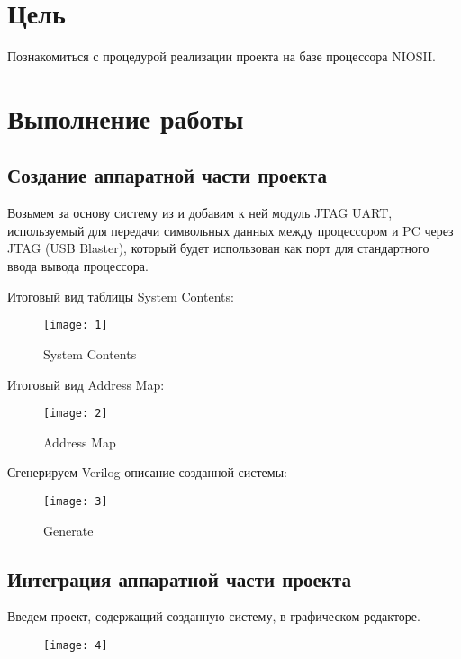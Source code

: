 





\tableofcontents
\lstlistoflistings
\listoffigures
\newpage

\section{Цель}

\noindent Познакомиться с процедурой реализации проекта на базе процессора NIOSII.

\section{Выполнение работы}

\subsection{Создание аппаратной части проекта}

Возьмем за основу систему из  и добавим к ней модуль JTAG UART, используемый для передачи символьных данных между процессором и PC через JTAG (USB Blaster), который будет использован как порт для стандартного ввода вывода процессора.

Итоговый вид таблицы System Contents:
\begin{figure}[H]
	\centering
	\texttt{[image: 1]}
	\caption{System Contents}
\end{figure}

Итоговый вид Address Map:
\begin{figure}[H]
	\centering
	\texttt{[image: 2]}
	\caption{Address Map}
\end{figure}

Сгенерируем Verilog описание созданной системы:
\begin{figure}[H]
	\centering
	\texttt{[image: 3]}
	\caption{Generate}
\end{figure}

\subsection{Интеграция аппаратной части проекта}

Введем проект, содержащий созданную систему, в графическом редакторе.
\begin{figure}[H]
	\centering
	\texttt{[image: 4]}
	\caption{}
\end{figure}


